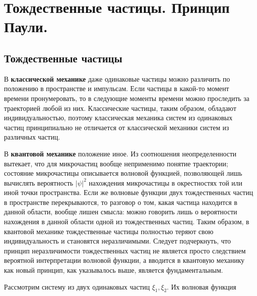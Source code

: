 \section {Тождественные частицы. Принцип Паули.}
\subsection {Тождественные частицы}
В \textbf{классической механике} даже одинаковые частицы можно различить по положению в пространстве и импульсам. Если частицы в какой-то момент времени пронумеровать, то в следующие моменты времени можно проследить за траекторией любой из них. Классические частицы, таким образом, обладают индивидуальностью, поэтому классическая механика систем из одинаковых частиц принципиально не отличается от классической механики систем из различных частиц. 

В \textbf{квантовой механике} положение иное. Из соотношения неопределенности вытекает, что для микрочастиц вообще неприменимо понятие траектории; состояние микрочастицы описывается волновой функцией, позволяющей лишь вычислять вероятность $|\psi|^2$ нахождения микрочастицы в окрестностях той или иной точки пространства. Если же волновые функции двух тождественных частиц в пространстве перекрываются, то разговор о том, какая частица находится в данной области, вообще лишен смысла: можно говорить лишь о вероятности нахождения в данной области одной из тождественных частиц. Таким образом, в квантовой механике тождественные частицы полностью теряют свою индивидуальность и становятся неразличимыми. Следует подчеркнуть, что принцип неразличимости тождественных частиц не является просто следствием вероятной интерпретации волновой функции, а вводится в квантовую механику как новый принцип, как указывалось выше, является фундаментальным.

Рассмотрим систему из двух одинаковых частиц $\xi_1, \xi_2$. Их волновая функция 

